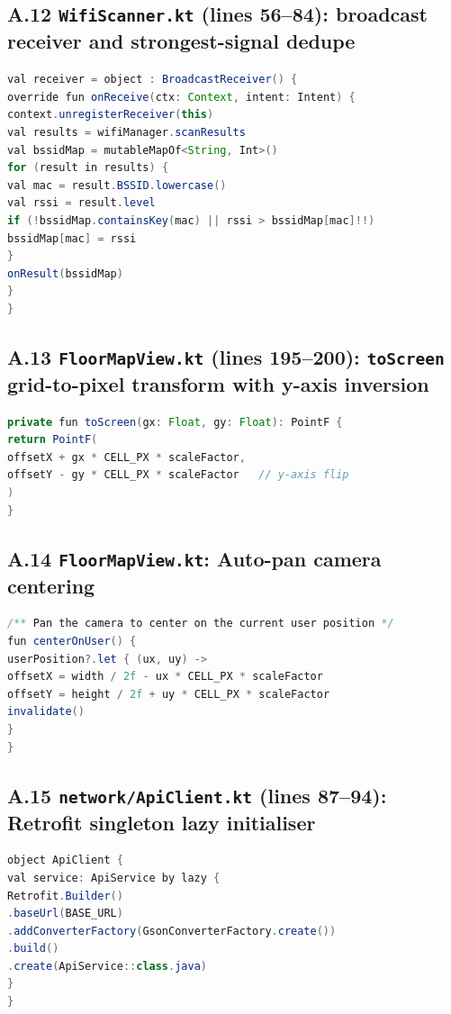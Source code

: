 \documentclass[11pt,a4paper]{article}
\begin{document}
\subsection*{A.12 \texttt{WifiScanner.kt} (lines 56--84): broadcast receiver and strongest-signal dedupe}
\begin{lstlisting}[language=Java]
val receiver = object : BroadcastReceiver() {
override fun onReceive(ctx: Context, intent: Intent) {
context.unregisterReceiver(this)
val results = wifiManager.scanResults
val bssidMap = mutableMapOf<String, Int>()
for (result in results) {
val mac = result.BSSID.lowercase()
val rssi = result.level
if (!bssidMap.containsKey(mac) || rssi > bssidMap[mac]!!)
bssidMap[mac] = rssi
}
onResult(bssidMap)
}
}
\end{lstlisting}
\subsection*{A.13 \texttt{FloorMapView.kt} (lines 195--200): \texttt{toScreen} grid-to-pixel transform with y-axis inversion}
\begin{lstlisting}[language=Java]
private fun toScreen(gx: Float, gy: Float): PointF {
return PointF(
offsetX + gx * CELL_PX * scaleFactor,
offsetY - gy * CELL_PX * scaleFactor   // y-axis flip
)
}
\end{lstlisting}
\subsection*{A.14 \texttt{FloorMapView.kt}: Auto-pan camera centering}
\begin{lstlisting}[language=Java]
/** Pan the camera to center on the current user position */
fun centerOnUser() {
userPosition?.let { (ux, uy) ->
offsetX = width / 2f - ux * CELL_PX * scaleFactor
offsetY = height / 2f + uy * CELL_PX * scaleFactor
invalidate()
}
}
\end{lstlisting}
\subsection*{A.15 \texttt{network/ApiClient.kt} (lines 87--94): Retrofit singleton lazy initialiser}
\begin{lstlisting}[language=Java]
object ApiClient {
val service: ApiService by lazy {
Retrofit.Builder()
.baseUrl(BASE_URL)
.addConverterFactory(GsonConverterFactory.create())
.build()
.create(ApiService::class.java)
}
}
\end{lstlisting}
\end{document}
